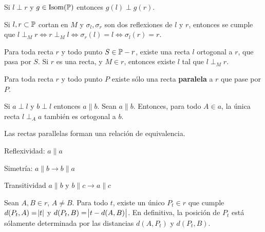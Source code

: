  Si $l \perp r$ y $g \in \iso(\P)$ entonces $g(l) \perp g(r)$.

\importante{} Si $l, r \subset \P$ cortan en $M$ y $\sigma_l, \sigma_r$ son dos reflexiones de $l$ y $r$, entonces se cumple que $l \perp_M r \iff r \perp_M l \iff \sigma_r(l) = l \iff \sigma_l(r) = r$.

\importante{} Para toda recta $r$ y todo punto $S \in \P - r$, existe una recta $l$ ortogonal a $r$, que pasa por $S$. Si $r$ es una recta, y $M \in r$, entonces existe $l$ tal que $l \perp_M r$.

 Para toda recta $r$ y todo punto $P$ existe sólo una recta \textbf{paralela} a $r$ que pase por $P$.

 Si $a \perp l$ y $b \perp l$ entonces $a \parallel b$. Sean $a \parallel b$. Entonces, para todo $A \in a$, la única recta $l \perp_A a$ también es ortogonal a $b$.

 Las rectas parallelas forman una relación de equivalencia.
\begin{itemizex}
	\item Reflexividad: $a\parallel a$
	\item Simetría: $a \parallel b \rightarrow b \parallel a$
	\item Transitividad  $a \parallel b $ y  $b \parallel c \rightarrow a \parallel c$
\end{itemizex}

 Sean $A,B \in r$, $A \neq B$. Para todo $t$, existe un único $P_t\in r$ que cumple $d(P_t,A) = \abs{t}$ y $d(P_t, B) = \abs{t-d(A,B)}$. En definitiva, la posición de $P_t$ está sólamente determinada por las distancias $d(A, P_t)$ y $d(P_t, B)$.
	 
	 
	 
	 
	 
	 
	 